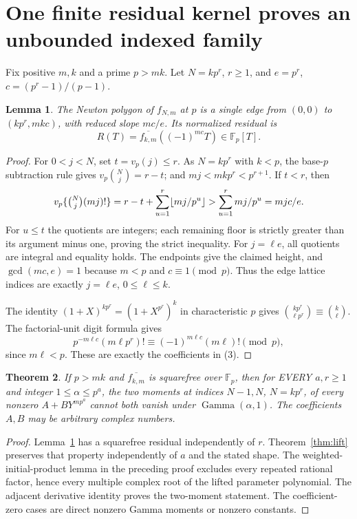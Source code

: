\documentclass[11pt]{article}
\newtheorem{theorem}{Theorem}
\newtheorem{lemma}[theorem]{Lemma}
\newcommand{\F}{\mathbb F}
\newcommand{\vp}{v_p}
\begin{document}
\section{One finite residual kernel proves an unbounded indexed family}
Fix positive $m,k$ and a prime $p>mk$. Let $N=kp^r$, $r\ge1$, and
$e=p^r$, $c=(p^r-1)/(p-1)$.

\begin{lemma}\label{lem:kernel}
The Newton polygon of $f_{N,m}$ at $p$ is a single edge from
$(0,0)$ to $(kp^r,mkc)$, with reduced slope $mc/e$. Its normalized
residual is
\[
 R(T)=\overline{f_{k,m}}((-1)^{mc}T)\in\F_p[T].   \tag{3}
\]
\end{lemma}
\begin{proof}
For $0<j<N$, set $t=\vp(j)\le r$.
As $N=kp^r$ with $k<p$, the base-$p$ subtraction rule gives
$\vp\binom Nj=r-t$; and $mj<mkp^r<p^{r+1}$.
If $t<r$, then
\[
 \vp\{\tbinom Nj(mj)!\}
 =r-t+\sum_{u=1}^r\lfloor mj/p^u\rfloor
 >\sum_{u=1}^r mj/p^u=mjc/e.
\]
For $u\le t$ the quotients are integers; each remaining floor is
strictly greater than its argument minus one, proving the strict inequality.
For $j=\ell e$, all quotients are integral and equality holds.
The endpoints give the claimed height, and $\gcd(mc,e)=1$ because
$m<p$ and $c\equiv1\pmod p$. Thus the edge lattice indices are
exactly $j=\ell e$, $0\le\ell\le k$.

The identity $(1+X)^{kp^r}=(1+X^{p^r})^k$ in characteristic $p$ gives
$\binom{kp^r}{\ell p^r}\equiv\binom k\ell$.
The factorial-unit digit formula gives
\[
 p^{-m\ell c}(m\ell p^r)!
 \equiv(-1)^{m\ell c}(m\ell)!\pmod p,
\]
since $m\ell<p$. These are exactly the coefficients in (3).
\end{proof}

\begin{theorem}\label{thm:indexed}
If $p>mk$ and $\overline{f_{k,m}}$ is squarefree over $\F_p$, then for
EVERY $a,r\ge1$ and integer $1\le\alpha\le p^a$, the two moments
at indices $N-1,N$, $N=kp^r$, of every nonzero
$A+BY^{mp^a}$ cannot both vanish under $\operatorname{Gamma}(\alpha,1)$.
The coefficients $A,B$ may be arbitrary complex numbers.
\end{theorem}
\begin{proof}
Lemma~\ref{lem:kernel} has a squarefree residual independently of $r$.
Theorem~\ref{thm:lift} preserves that property independently of $a$ and
the stated shape. The weighted-initial-product lemma in the preceding
proof excludes every repeated rational factor, hence every multiple
complex root of the lifted parameter polynomial. The adjacent derivative
identity proves the two-moment statement. The coefficient-zero cases are
direct nonzero Gamma moments or nonzero constants.
\end{proof}
\end{document}

